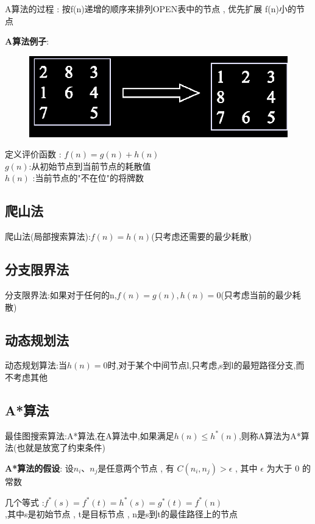 \documentclass[UTF8,a4paper]{ctexart}
\begin{document}
A算法的过程 : 按f(n)递增的顺序来排列OPEN表中的节点 , 优先扩展 f(n)小的节点

\textbf{A算法例子}:
\begin{figure}[H]
	\centering
	\includegraphics[scale = 0.3]{assets/ArtificialIntelligence_2e222.png}
\end{figure}

定义评价函数 : $f(n) = g(n) + h(n)$\\
$g(n)$:从初始节点到当前节点的耗散值\\
$h(n)$ :当前节点的"不在位"的将牌数

\subsection{爬山法}

爬山法(局部搜索算法):$f(n) = h(n)$(只考虑还需要的最少耗散)

\subsection{分支限界法}

分支限界法:如果对于任何的n,$f(n) = g(n) , h(n) = 0$(只考虑当前的最少耗散)

\subsection{动态规划法}

动态规划算法:当$h(n) = 0$时,对于某个中间节点l,只考虑,s到l的最短路径分支,而不考虑其他

\subsection{A*算法}

最佳图搜索算法:A*算法,在A算法中,如果满足$h(n) \leq h^*(n)$,则称A算法为A*算法(也就是放宽了约束条件)

\textbf{A*算法的假设}:
设$n_i$、$n_j$是任意两个节点 , 有 $C(n_i , n_j) > \epsilon$ , 其中 $\epsilon$ 为大于 0 的常数

几个等式 :$f^*(s) = f^*(t) = h^*(s) = g^*(t) = f^*(n)$\\
,其中s是初始节点 , t是目标节点 , n是s到t的最佳路径上的节点
\end{document}
